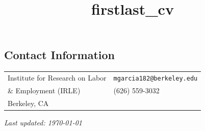 \documentclass[margin,line]{res}
\begin{document}
\title{firstlast_cv}
\begin{resume}

\section{\sc Contact Information}

\vspace{.05in}
\begin{tabular}{@{}p{2.75in}p{2in}}
Institute for Research on Labor &  \verb+mgarcia182@berkeley.edu+ \\
 \& Employment (IRLE) & (626) 559-3032 \\
Berkeley, CA & %
\end{tabular}






%
%


%
%





%

%


\hspace{1cm}
\hspace*{\fill} \emph{Last updated: \today}


\end{resume}
\end{document}
